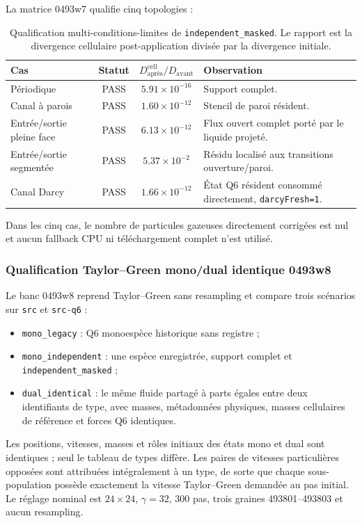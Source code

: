 \documentclass[11pt,a4paper]{article}
\begin{document}
La matrice 0493w7 qualifie cinq topologies :
\begin{table}[htbp]
\centering
\small
\caption{Qualification multi-conditions-limites de \texttt{independent\_masked}. Le rapport est la divergence cellulaire post-application divisée par la divergence initiale.}
\begin{tabular}{@{}lccp{}@{}}
\toprule
Cas & Statut & $D^{\mathrm{cell}}_{\mathrm{après}}/D_{\mathrm{avant}}$ & Observation \\
\midrule
Périodique & PASS & $5.91\times10^{-16}$ & Support complet. \\
Canal à parois & PASS & $1.60\times10^{-12}$ & Stencil de paroi résident. \\
Entrée/sortie pleine face & PASS & $6.13\times10^{-12}$ & Flux ouvert complet porté par le liquide projeté. \\
Entrée/sortie segmentée & PASS & $5.37\times10^{-2}$ & Résidu localisé aux transitions ouverture/paroi. \\
Canal Darcy & PASS & $1.66\times10^{-12}$ & État Q6 résident consommé directement, \texttt{darcyFresh=1}. \\
\bottomrule
\end{tabular}
\end{table}
Dans les cinq cas, le nombre de particules gazeuses directement corrigées est nul et aucun fallback CPU ni téléchargement complet n'est utilisé.

\subsubsection{Qualification Taylor--Green mono/dual identique 0493w8}

Le banc 0493w8 reprend Taylor--Green sans resampling et compare trois scénarios sur \texttt{src} et \texttt{src-q6} :
\begin{itemize}[nosep]
  \item \texttt{mono\_legacy} : Q6 monoespèce historique sans registre ;
  \item \texttt{mono\_independent} : une espèce enregistrée, support complet et \texttt{independent\_masked} ;
  \item \texttt{dual\_identical} : le même fluide partagé à parts égales entre deux identifiants de type, avec masses, métadonnées physiques, masses cellulaires de référence et forces Q6 identiques.
\end{itemize}
Les positions, vitesses, masses et rôles initiaux des états mono et dual sont identiques ; seul le tableau de types diffère. Les paires de vitesses particulières opposées sont attribuées intégralement à un type, de sorte que chaque sous-population possède exactement la vitesse Taylor--Green demandée au pas initial. Le réglage nominal est $24\times24$, $\gamma=32$, $300$ pas, trois graines 493801--493803 et aucun resampling.
\end{document}

